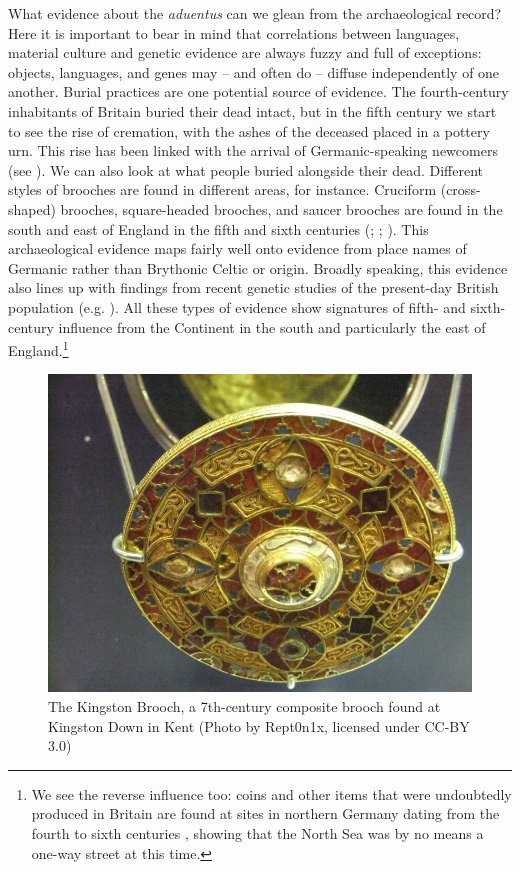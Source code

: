 \hspace*{-5pt}What evidence about the \emph{aduentus} can we glean from the archaeological record? Here it is important to bear in mind that correlations between languages, material culture and genetic evidence are always fuzzy and full of exceptions: objects, languages, and genes may -- and often do -- diffuse independently of one another. Burial practices are one potential source of evidence. The fourth-century inhabitants of Britain buried their dead intact, but in the fifth century we start to see the rise of cremation, with the ashes of the deceased placed in a pottery urn. This rise has been linked with the arrival of Germanic-speaking newcomers (see \citealp[195--207]{Gerrard2013}). We can also look at what people buried alongside their dead. Different styles of brooches are found in different areas, for instance. Cruciform (cross-shaped) brooches, square-headed brooches, and saucer brooches are found in the south and east of England in the fifth and sixth centuries (\citealp[45--54]{Fleming2010}; \citealp[78--87]{Higham2013}; \citealp{Martin2015}). This archaeological evidence maps fairly well onto evidence from place names of Germanic rather than Brythonic Celtic or  origin. Broadly speaking, this evidence also lines up with findings from recent genetic studies of the present-day British population (e.g. \citealt{Leslie2015}). All these types of evidence show signatures of fifth- and sixth-century influence from the Continent in the south and particularly the east of England.\footnote{We see the reverse influence too: coins and other items that were undoubtedly produced in Britain are found at sites in northern Germany dating from the fourth to sixth centuries \citep{Gruenewald2019,Rau2019}, showing that the North Sea was by no means a one-way street at this time.}

\begin{figure}
        \includegraphics[scale=0.3]{chapters/img/Kingston_brooch.png}
    \caption{The Kingston Brooch, a 7th-century composite brooch found at Kingston Down in Kent (Photo by Rept0n1x, licensed under CC-BY 3.0)}
    \label{fig:kingston_brooch}
\end{figure}

